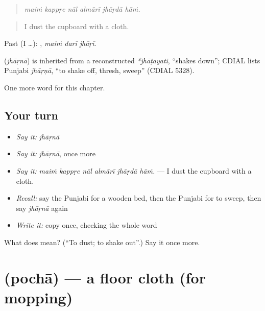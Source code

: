 \begin{quote}
     
\end{quote}

\begin{quote}
\emph{maiṁ kappṛe nāl almārī jhāṛdā hāṁ.}
\end{quote}

\begin{quote}
I dust the cupboard with a cloth.
\end{quote}

Past (I …):   , \emph{maiṁ darī jhāṛī}.

\begin{cousinweb}
\textbf{} (\emph{jhāṛnā}) is inherited from a reconstructed \emph{*jhāṭayati}, \textquotedblleft{}shakes down\textquotedblright{}; CDIAL lists Punjabi \emph{jhāṛṇā}, \textquotedblleft{}to shake off, thresh, sweep\textquotedblright{} (CDIAL 5328).
\end{cousinweb}

\begin{grammarlens}[title={What you've built}]
One more word for this chapter.
\end{grammarlens}

\subsection*{Your turn}
\begin{itemize}
\raggedright
  \item \emph{Say it:} \emph{jhāṛnā}
  \item \emph{Say it:} \emph{jhāṛnā}, once more
  \item \emph{Say it:} \emph{maiṁ kappṛe nāl almārī jhāṛdā hāṁ.} — I dust the cupboard with a cloth.
  \item \emph{Recall:} say the Punjabi for a wooden bed, then the Punjabi for to sweep, then say \emph{jhāṛnā} again
  \item \emph{Write it:} copy \textbf{} once, checking the whole word
\end{itemize}

\begin{tcolorbox}[breakable,colback=teal!4,colframe=teal!35!black,title={Before you move on}]
What does  mean? (\textquotedblleft{}To dust; to shake out\textquotedblright{}.) Say it once more.
\end{tcolorbox}
\section[\texorpdfstring{\pa{ਪੋਚਾ} (pochā)}{ਪੋਚਾ (pochā)}]{ (pochā) — a floor cloth (for mopping)}

